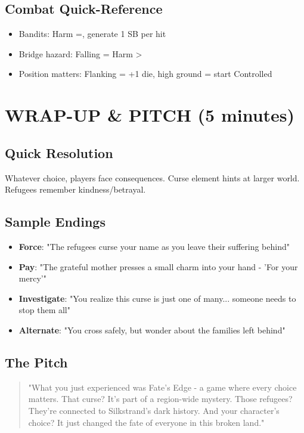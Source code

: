 \documentclass[12pt]{article}
\begin{document}
\subsection*{Combat Quick-Reference}
\begin{itemize}
\item Bandits: Harm =, generate 1 SB per hit
\item Bridge hazard: Falling = Harm >
\item Position matters: Flanking = +1 die, high ground = start Controlled
\end{itemize}

\section{WRAP-UP \& PITCH (5 minutes)}

\subsection*{Quick Resolution}
Whatever choice, players face consequences. Curse element hints at larger world. Refugees remember kindness/betrayal.

\subsection*{Sample Endings}
\begin{itemize}
\item \textbf{Force}: "The refugees curse your name as you leave their suffering behind"
\item \textbf{Pay}: "The grateful mother presses a small charm into your hand - 'For your mercy'"
\item \textbf{Investigate}: "You realize this curse is just one of many... someone needs to stop them all"
\item \textbf{Alternate}: "You cross safely, but wonder about the families left behind"
\end{itemize}

\subsection*{The Pitch}
\begin{quote}
"What you just experienced was Fate's Edge - a game where every choice matters. That curse? It's part of a region-wide mystery. Those refugees? They're connected to Silkstrand's dark history. And your character's choice? It just changed the fate of everyone in this broken land."
\end{quote}
\end{document}
